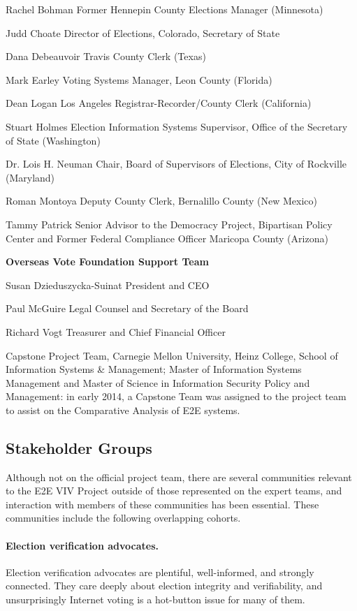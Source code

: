 Rachel Bohman
Former Hennepin County Elections Manager (Minnesota)

Judd Choate
Director of Elections, Colorado, Secretary of State

Dana Debeauvoir
Travis County Clerk (Texas)
 
Mark Earley
Voting Systems Manager, Leon County (Florida)
 
Dean Logan
Los Angeles Registrar-Recorder/County Clerk (California)

Stuart Holmes
Election Information Systems Supervisor, Office of the Secretary of State (Washington)
 
Dr. Lois H. Neuman
Chair, Board of Supervisors of Elections, City of Rockville (Maryland)
 
Roman Montoya
Deputy County Clerk, Bernalillo County (New Mexico)
 
Tammy Patrick
Senior Advisor to the Democracy Project, Bipartisan Policy Center and Former Federal Compliance Officer Maricopa County (Arizona)
 
\textbf{Overseas Vote Foundation Support Team}

Susan Dzieduszycka-Suinat
President and CEO
 
Paul McGuire
Legal Counsel and Secretary of the Board
 
Richard Vogt
Treasurer and Chief Financial Officer

Capstone Project Team, Carnegie Mellon University, Heinz College,
School of Information Systems \& Management; Master of Information
Systems Management and Master of Science in Information Security
Policy and Management: in early 2014, a Capstone Team was assigned to
the project team to assist on the Comparative Analysis of E2E systems.

\subsection{Stakeholder Groups}
\label{sec:stakeholder-groups}

Although not on the official project team, there are several
communities relevant to the E2E VIV Project outside of those
represented on the expert teams, and interaction with members of these
communities has been essential. These communities include the
following overlapping cohorts.

\paragraph{Election verification advocates.} Election verification
advocates are plentiful, well-informed, and strongly connected.  They
care deeply about election integrity and verifiability, and
unsurprisingly Internet voting is a hot-button issue for many of them.

